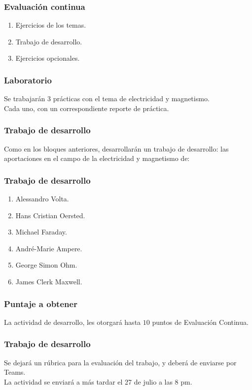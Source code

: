 \documentclass[14pt]{beamer}
\begin{document}
\begin{frame}
\frametitle{Evaluación continua}
\begin{enumerate}[<+->]
\item Ejercicios de los temas.
\item Trabajo de desarrollo.
\item Ejercicios opcionales. 
\end{enumerate}
\end{frame}
\begin{frame}
\frametitle{Laboratorio}
Se trabajarán 3 prácticas con el tema de electricidad y magnetismo.
\\
\bigskip
\pause
Cada uno, con un correspondiente reporte de práctica.
\end{frame}
\begin{frame}
\frametitle{Trabajo de desarrollo}
Como en los bloques anteriores, desarrollarán un trabajo de desarrollo: \pause las aportaciones en el campo de la electricidad y magnetismo de:
\end{frame}
\begin{frame}
\frametitle{Trabajo de desarrollo}
\begin{enumerate}[<+->]
\item Alessandro Volta.
\item Hans Cristian Oersted.
\item Michael Faraday.
\item André-Marie Ampere.
\item George Simon Ohm.
\item James Clerk Maxwell.
\end{enumerate}
\end{frame}
\begin{frame}
\frametitle{Puntaje a obtener}
La actividad de desarrollo, les otorgará hasta $10$ puntos de Evaluación Continua.
\end{frame}
\begin{frame}
\frametitle{Trabajo de desarrollo}
Se dejará un rúbrica para la evaluación del trabajo, y deberá de enviarse por Teams.
\\
\bigskip
\pause
La actividad se enviará a más tardar el 27 de julio a las 8 pm.
\end{frame}
\end{document}
